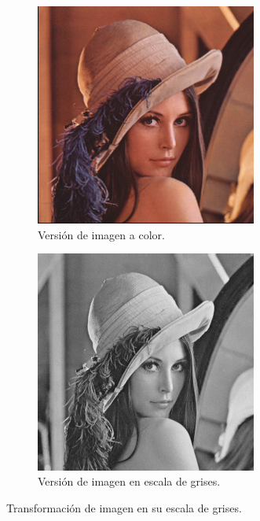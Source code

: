 \documentclass[letter,12pt]{report}
\begin{document}
\begin{figure}[H]
    \begin{subfigure}{0.5\textwidth}
        \centering
        \includegraphics[width=0.8\textwidth]{color}
        \caption{Versión de imagen a color.}
        \label{fig:color}
    \end{subfigure}
    \begin{subfigure}{0.5\textwidth}
        \centering
        \includegraphics[width=0.8\textwidth]{gray}
        \caption{Versión de imagen en escala de grises.}
        \label{fig:gray}
    \end{subfigure}
    \caption{Transformación de imagen en su escala de grises.}
    \label{fig:lenna}
\end{figure}
\end{document}
